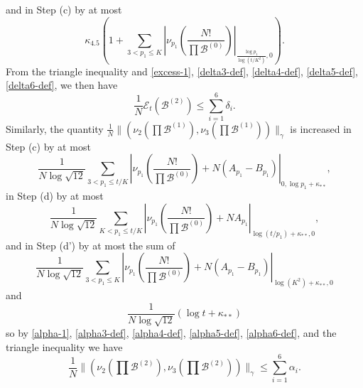\documentclass[10pt,a4paper,reqno]{amsart}
\numberwithin{equation}{section}
\theoremstyle{plain}
\theoremstyle{definition}
\newcommand\tuple{{\mathcal B}}
\newcommand\excess{{\mathcal{E}}}
\begin{document}
and in Step (c) by at most
$$ \kappa_{4.5} \left(1 + \sum_{3 < p_1 \leq K} \left|\nu_{p_1}\left( \frac{N!}{\prod \tuple^{(0)}} \right) \right|_{\frac{\log p_1}{\log(t/K^2)},0}\right).$$
From the triangle inequality and \eqref{excess-1}, \eqref{delta3-def}, \eqref{delta4-def}, \eqref{delta5-def}, \eqref{delta6-def}, we then have
\begin{equation}\label{excess-2}
   \frac{1}{N} \excess_t(\tuple^{(2)}) \leq \sum_{i=1}^6 \delta_i.
\end{equation}
Similarly, the quantity $\frac{1}{N} \| (\nu_2(\prod \tuple^{(1)}),\nu_3(\prod \tuple^{(1)}))\|_\gamma$ is increased in Step (c) by at most
$$\frac{1}{N\log \sqrt{12}} \sum_{3 < p_1 \leq t/K} \left|\nu_{p_1}\left( \frac{N!}{\prod \tuple^{(0)}} \right) + N(A_{p_1} - B_{p_1}) \right|_{0,\log p_1 + \kappa_{**}},$$
in Step (d) by at most
$$\frac{1}{N\log \sqrt{12}} \sum_{K < p_1 \leq t/K} \left|\nu_{p_1}\left( \frac{N!}{\prod \tuple^{(0)}} \right) + NA_{p_1} \right|_{\log(t/p_1) + \kappa_{**},0},$$
and in Step (d') by at most the sum of
$$\frac{1}{N\log \sqrt{12}} \sum_{3 < p_1 \leq K} \left|\nu_{p_1}\left( \frac{N!}{\prod \tuple^{(0)}} \right) + N(A_{p_1}-B_{p_1}) \right|_{\log(K^2) + \kappa_{**},0}$$
and
$$\frac{1}{N\log \sqrt{12}} \left( \log t + \kappa_{**} \right)$$
so by \eqref{alpha-1}, \eqref{alpha3-def}, \eqref{alpha4-def}, \eqref{alpha5-def}, \eqref{alpha6-def}, and the triangle inequality we have
\begin{equation}\label{alpha-2} 
\frac{1}{N} \| (\nu_2(\prod \tuple^{(2)}), \nu_3(\prod \tuple^{(2)})) \|_\gamma \leq \sum_{i=1}^6 \alpha_i.
\end{equation}
\end{document}
